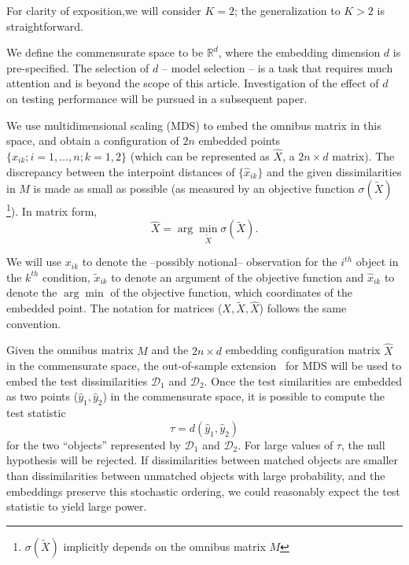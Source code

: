 \documentclass[12pt]{article} %
\newenvironment{remark}[1][Remark]{\begin{trivlist}
\item[\hskip \labelsep {\bfseries #1}]}{\end{trivlist}}
\begin{document}
\begin{remark}
For clarity of exposition,we will consider $K=2$; the generalization to $K>2$ is straightforward. 
\end{remark}

We define the commensurate space to be  $\mathbb{R}^d$, where the embedding dimension $d$ is pre-specified. The selection of $d$ -- model selection -- is  a task that requires much attention and is  beyond the scope of this article. Investigation of the effect of $d$ on testing performance will be pursued in a  subsequent paper.

 We use multidimensional scaling (MDS) \cite{borg+groenen:1997} to embed  the omnibus matrix in this  space, and obtain  a configuration of $2n$ embedded points $\{\hat{x}_{ik}; i=1,\ldots,n;k=1,2\}$ (which can be represented as $\hat{X}$, a $2n \times d$ matrix). The discrepancy between the interpoint distances of $\{\hat{x}_{ik}\}$ and the given dissimilarities in  $M$ is made as small  as possible (as measured by an objective function $\sigma(\widetilde{X})$ \footnote{$\sigma(\widetilde{X})$ implicitly depends on the omnibus matrix $M$}). In matrix form, $$ \hat{X}=\arg \min_{\tilde{X}} \sigma(\tilde{X}).$$ 

\begin{remark} 
We will use $x_{ik}$ to denote the --possibly notional--  observation  for the $i^{th}$ object in the $k^{th}$ condition, $\tilde{x}_{ik}$ to denote an argument of the objective function  and  $\hat{x}_{ik}$  to denote the $\arg\min$  of the objective function, which coordinates of the embedded point. The notation for matrices ($X,\tilde{X},\hat{X}$) follows the  same convention.
\end{remark}

  Given the omnibus matrix $M$ and the $2n \times d$ embedding configuration matrix $\hat{X}$ in the commensurate space, the out-of-sample extension~\cite{TrossetOOS} for MDS will be used to embed the test dissimilarities $\mathcal{D}_1$ and $\mathcal{D}_2$.  Once the test similarities are embedded as two points ($\hat{y}_{1},\hat{y}_{2}$) in  the commensurate space, it is possible to  compute the test statistic \[
\tau=d\left(\hat{y}_{1},\hat{y}_{2}\right)\label{teststat}
\] for the two ``objects'' represented by  $\mathcal{D}_1$ and $\mathcal{D}_2$.  For large values of $\tau$, the null hypothesis will be rejected. 
   If  dissimilarities between matched objects are smaller than dissimilarities between unmatched objects with large probability, and the embeddings preserve this stochastic ordering,  we could reasonably expect the test statistic to yield large  power. 
\end{document}
